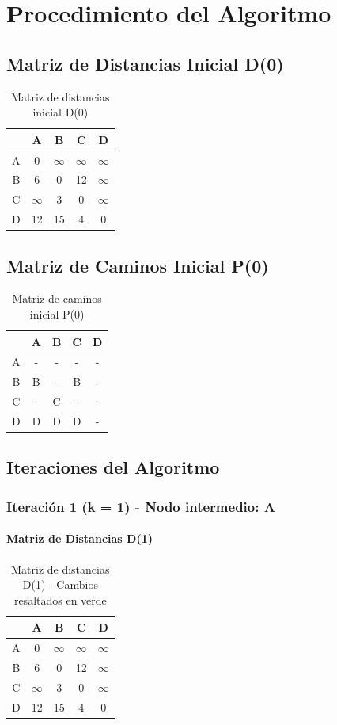 \documentclass[12pt]{article}
\begin{document}
\clearpage
\section{Procedimiento del Algoritmo}
\subsection{Matriz de Distancias Inicial D(0)}
\begin{table}[h!]
\centering
\begin{tabular}{|c|c|c|c|c|}
\hline
 & A & B & C & D \\\hline
A & 0 & $\infty$ & $\infty$ & $\infty$ \\\hline
B & 6 & 0 & 12 & $\infty$ \\\hline
C & $\infty$ & 3 & 0 & $\infty$ \\\hline
D & 12 & 15 & 4 & 0 \\\hline
\end{tabular}
\caption{Matriz de distancias inicial D(0)}
\end{table}

\clearpage
\subsection{Matriz de Caminos Inicial P(0)}
\begin{table}[h!]
\centering
\begin{tabular}{|c|c|c|c|c|}
\hline
 & A & B & C & D \\\hline
A & - & - & - & - \\\hline
B & B & - & B & - \\\hline
C & - & C & - & - \\\hline
D & D & D & D & - \\\hline
\end{tabular}
\caption{Matriz de caminos inicial P(0)}
\end{table}

\clearpage
\subsection{Iteraciones del Algoritmo}
\subsubsection{Iteración 1 (k = 1) - Nodo intermedio: A}
\paragraph{Matriz de Distancias D(1)}
\begin{table}[h!]
\centering
\begin{tabular}{|c|c|c|c|c|}
\hline
 & A & B & C & D \\\hline
A & 0 & $\infty$ & $\infty$ & $\infty$ \\\hline
B & 6 & 0 & 12 & $\infty$ \\\hline
C & $\infty$ & 3 & 0 & $\infty$ \\\hline
D & 12 & 15 & 4 & 0 \\\hline
\end{tabular}
\caption{Matriz de distancias D(1) - Cambios resaltados en verde}
\end{table}
\end{document}
